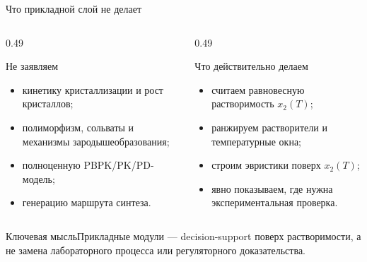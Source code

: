 \documentclass[aspectratio=169,10pt]{beamer}
\newcommand{\keybox}[1]{\begin{block}{Ключевая мысль}#1\end{block}}
\newcommand{\tightitems}{\setlength{\itemsep}{0.25em}}
\begin{document}
\begin{frame}{Что прикладной слой не делает}
  \small
  \begin{columns}[T,onlytextwidth]
    \begin{column}{0.49\textwidth}
      \begin{block}{Не заявляем}
        \scriptsize
        \begin{itemize}\tightitems
          \item кинетику кристаллизации и рост кристаллов;
          \item полиморфизм, сольваты и механизмы зародышеобразования;
          \item полноценную PBPK/PK/PD-модель;
          \item генерацию маршрута синтеза.
        \end{itemize}
      \end{block}
    \end{column}
    \begin{column}{0.49\textwidth}
      \begin{block}{Что действительно делаем}
        \scriptsize
        \begin{itemize}\tightitems
          \item считаем равновесную растворимость $x_2(T)$;
          \item ранжируем растворители и температурные окна;
          \item строим эвристики поверх $x_2(T)$;
          \item явно показываем, где нужна экспериментальная проверка.
        \end{itemize}
      \end{block}
    \end{column}
  \end{columns}
  \vspace{0.35em}
  \keybox{\scriptsize Прикладные модули — decision-support поверх растворимости, а не замена лабораторного процесса или регуляторного доказательства.}
\end{frame}
\end{document}
